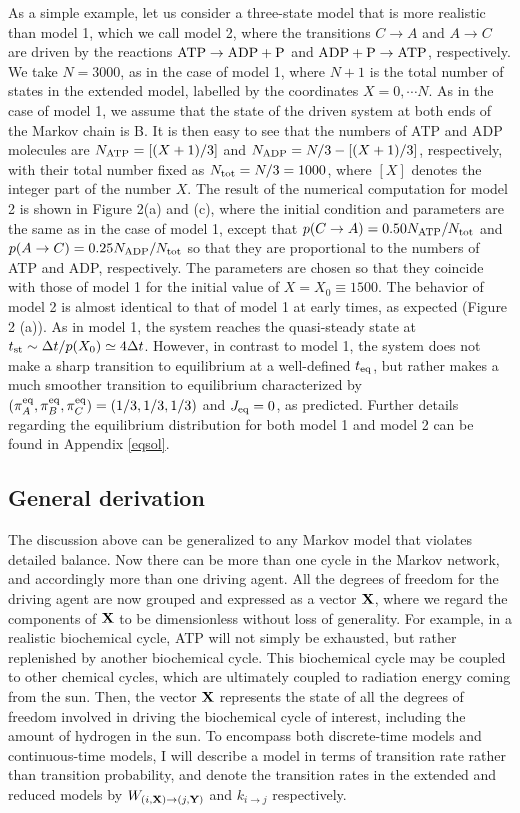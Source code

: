 \documentclass[aps,pre,amsmath,amssymb,floatfix,preprint,nofootinbib]{revtex4}
\begin{document}
As a simple example, let us consider a three-state model that is more realistic than model 1, which we call model 2, where the transitions   $C \to A$ and $A \to C$ are driven by the reactions ${\rm ATP} \to {\rm ADP}+{\rm P}$ and ${\rm ADP}+{\rm P} \to {\rm ATP}$, respectively. We take $N=3000$, as in the case of model 1, where $N+1$ is the total number of states in the extended model, labelled by the coordinates $X=0, \cdots N$. As in the case of model 1, we assume that the state of the driven system at both ends of the Markov chain is B. It is then easy to see that the numbers of ATP and ADP molecules are $N_{\rm ATP}= [(X+1)/3]$ and $N_{\rm ADP} = N/3-[(X+1)/3]$, respectively, with their total number fixed as $N_{\rm tot}=N/3 =1000$, where $[X]$ denotes the integer part of the number $X$.  The result of the numerical computation for model 2 is shown in Figure 2(a) and (c), where the initial condition and parameters are the same as in the case of model 1, except that 
 $p(C \to A) = 0.50 N_{\rm ATP} /N_{\rm tot}$ and $p(A \to C) = 0.25 N_{\rm ADP}/N_{\rm tot} $ so that they are proportional to the numbers of ATP and ADP, respectively. The parameters are chosen so that they coincide with those of model 1 for the initial value of $X=X_0 \equiv 1500$.  The behavior of model 2 is almost identical to that of model 1 at early times, as expected (Figure 2 (a)). As in  model 1, the system reaches the quasi-steady state at $t_{\rm st}\sim \Delta t/p(X_0)\simeq 4 \Delta t$.  However, in contrast to model 1, the system does not make a sharp transition to equilibrium at a well-defined $t_{\rm eq}$, but rather makes a much smoother transition to equilibrium characterized by $(\pi^{\rm eq}_A ,\pi^{\rm eq}_B,\pi^{\rm eq}_C) = (1/3,1/3,1/3)$ and $J_{\rm eq}=0$, as predicted. Further details regarding the equilibrium distribution for both model 1 and model 2 can be found in Appendix \ref{eqsol}. 
 
\subsection{General derivation}
  The discussion above can be generalized to any Markov model that violates detailed balance. Now there can be more than one cycle in the Markov network, and accordingly more than one driving agent. All the degrees of freedom for the driving agent are now grouped and expressed as a vector ${\bf X}$,  where we regard the components of ${\bf X}$ to be dimensionless without loss of generality.  For example, in a realistic biochemical cycle, ATP will not simply be exhausted, but rather replenished by another biochemical cycle. This biochemical cycle may be coupled to other chemical cycles, which are ultimately coupled to radiation energy coming from the sun.  Then, the vector ${\bf X}$ represents the state of all the degrees of freedom involved in driving the biochemical cycle of interest, including the amount of hydrogen in the sun. To encompass both discrete-time models and continuous-time models, I will describe a model in terms of transition rate rather than transition probability, and denote the transition rates in the extended and reduced models by $W_{(i,{\bf X}) \to (j,{\bf Y})}$ and $k_{i \to j}$ respectively.
  
\end{document}
